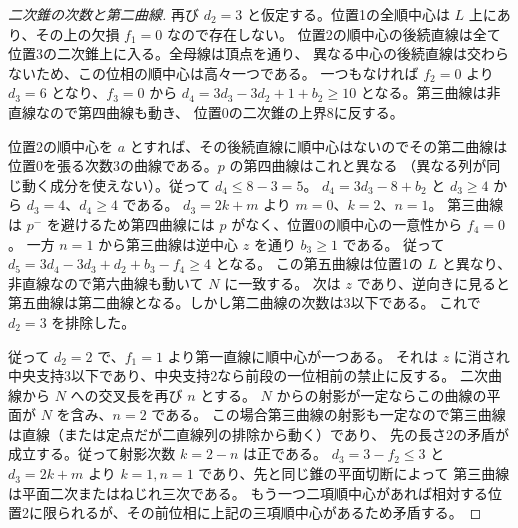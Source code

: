 \begin{proof}[二次錐の次数と第二曲線]
再び $d_2=3$ と仮定する。位置1の全順中心は $L$ 上にあり、その上の欠損 $f_1=0$ なので存在しない。
位置2の順中心の後続直線は全て位置3の二次錐上に入る。全母線は頂点を通り、
異なる中心の後続直線は交わらないため、この位相の順中心は高々一つである。
一つもなければ $f_2=0$ より $d_3=6$ となり、$f_3=0$ から
$d_4=3d_3-3d_2+1+b_2\ge10$ となる。第三曲線は非直線なので第四曲線も動き、
位置0の二次錐の上界8に反する。

位置2の順中心を $a$ とすれば、その後続直線に順中心はないのでその第二曲線は
位置0を張る次数3の曲線である。$p$ の第四曲線はこれと異なる
（異なる列が同じ動く成分を使えない）。従って $d_4\le8-3=5$。
$d_4=3d_3-8+b_2$ と $d_3\ge4$ から $d_3=4$、$d_4\ge4$ である。
$d_3=2k+m$ より $m=0$、$k=2$、$n=1$。
第三曲線は $p^-$ を避けるため第四曲線には $p$ がなく、位置0の順中心の一意性から $f_4=0$。
一方 $n=1$ から第三曲線は逆中心 $z$ を通り $b_3\ge1$ である。
従って $d_5=3d_4-3d_3+d_2+b_3-f_4\ge4$ となる。
この第五曲線は位置1の $L$ と異なり、非直線なので第六曲線も動いて $N$ に一致する。
次は $z$ であり、逆向きに見ると第五曲線は第二曲線となる。しかし第二曲線の次数は3以下である。
これで $d_2=3$ を排除した。

従って $d_2=2$ で、$f_1=1$ より第一直線に順中心が一つある。
それは $z$ に消され中央支持3以下であり、中央支持2なら前段の一位相前の禁止に反する。
二次曲線から $N$ への交叉長を再び $n$ とする。
$N$ からの射影が一定ならこの曲線の平面が $N$ を含み、$n=2$ である。
この場合第三曲線の射影も一定なので第三曲線は直線（または定点だが二直線列の排除から動く）であり、
先の長さ2の矛盾が成立する。従って射影次数 $k=2-n$ は正である。
$d_3=3-f_2\le3$ と $d_3=2k+m$ より $k=1,n=1$ であり、先と同じ錐の平面切断によって
第三曲線は平面二次またはねじれ三次である。
もう一つ二項順中心があれば相対する位置2に限られるが、その前位相に上記の三項順中心があるため矛盾する。
\end{proof}

